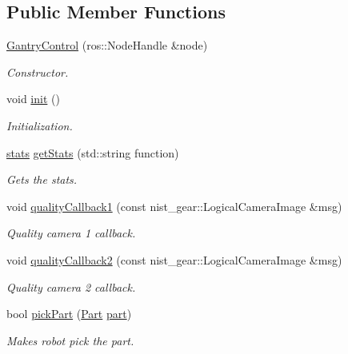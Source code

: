 \subsection*{Public Member Functions}
\begin{DoxyCompactItemize}
\item 
\hyperlink{classGantryControl_a9b8ad2f8dda14130976eb5d9634acbae}{Gantry\+Control} (ros\+::\+Node\+Handle \&node)
\begin{DoxyCompactList}\small\item\em Constructor. \end{DoxyCompactList}\item 
void \hyperlink{classGantryControl_a71f13d325c732d931ed5ed175c5b3e7a}{init} ()
\begin{DoxyCompactList}\small\item\em Initialization. \end{DoxyCompactList}\item 
\hyperlink{utils_8h_abd807f196b951c0cdd24d50164d54763}{stats} \hyperlink{classGantryControl_a2ac175070ddb578c03bb5a33cf2d49a4}{get\+Stats} (std\+::string function)
\begin{DoxyCompactList}\small\item\em Gets the stats. \end{DoxyCompactList}\item 
void \hyperlink{classGantryControl_a6557b18bde7b776e6a05fe85d9e858d9}{quality\+Callback1} (const nist\+\_\+gear\+::\+Logical\+Camera\+Image \&msg)
\begin{DoxyCompactList}\small\item\em Quality camera 1 callback. \end{DoxyCompactList}\item 
void \hyperlink{classGantryControl_a355b299969bfa74073062ba1c6c1ec04}{quality\+Callback2} (const nist\+\_\+gear\+::\+Logical\+Camera\+Image \&msg)
\begin{DoxyCompactList}\small\item\em Quality camera 2 callback. \end{DoxyCompactList}\item 
bool \hyperlink{classGantryControl_a123e820d39664f98c9417a7ed310f1f3}{pick\+Part} (\hyperlink{structPart}{Part} \hyperlink{utils_8h_a67ee3a5b9091664130eca8efc8b97ab9}{part})
\begin{DoxyCompactList}\small\item\em Makes robot pick the part. \end{DoxyCompactList}\item 

\end{DoxyCompactItemize}
